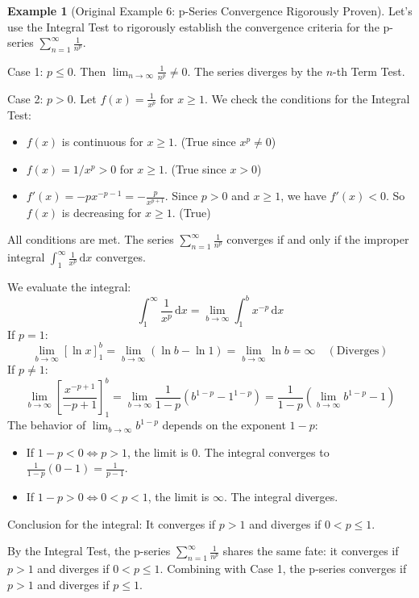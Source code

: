 \documentclass[11pt, letterpaper]{article}
\theoremstyle{plain} %
\theoremstyle{definition} %
\newtheorem{example}[theorem]{Example} %
\theoremstyle{remark} %
\newcommand{\dx}{\,\mathrm{d}x} %
\begin{document}
\begin{example}[Original Example 6: p-Series Convergence Rigorously Proven]
Let's use the Integral Test to rigorously establish the convergence criteria for the p-series $\sum_{n=1}^{\infty} \frac{1}{n^p}$.

Case 1: $p \le 0$. Then $\lim_{n \to \infty} \frac{1}{n^p} \neq 0$. The series diverges by the $n$-th Term Test.

Case 2: $p > 0$. Let $f(x) = \frac{1}{x^p}$ for $x \ge 1$. We check the conditions for the Integral Test:
\begin{itemize}
    \item $f(x)$ is continuous for $x \ge 1$. (True since $x^p \neq 0$)
    \item $f(x) = 1/x^p > 0$ for $x \ge 1$. (True since $x>0$)
    \item $f'(x) = -p x^{-p-1} = -\frac{p}{x^{p+1}}$. Since $p>0$ and $x \ge 1$, we have $f'(x) < 0$. So $f(x)$ is decreasing for $x \ge 1$. (True)
\end{itemize}
All conditions are met. The series $\sum_{n=1}^\infty \frac{1}{n^p}$ converges if and only if the improper integral $\int_1^{\infty} \frac{1}{x^p} \dx$ converges.

We evaluate the integral:
\[ \int_1^{\infty} \frac{1}{x^p} \dx = \lim_{b \to \infty} \int_1^b x^{-p} \dx \]
If $p=1$:
\[ \lim_{b \to \infty} [\ln x]_1^b = \lim_{b \to \infty} (\ln b - \ln 1) = \lim_{b \to \infty} \ln b = \infty \quad (\text{Diverges}) \]
If $p \neq 1$:
\[ \lim_{b \to \infty} \left[ \frac{x^{-p+1}}{-p+1} \right]_1^b = \lim_{b \to \infty} \frac{1}{1-p} (b^{1-p} - 1^{1-p}) = \frac{1}{1-p} \left( \lim_{b \to \infty} b^{1-p} - 1 \right) \]
The behavior of $\lim_{b \to \infty} b^{1-p}$ depends on the exponent $1-p$:
\begin{itemize}
    \item If $1-p < 0 \iff p > 1$, the limit is $0$. The integral converges to $\frac{1}{1-p}(0-1) = \frac{1}{p-1}$.
    \item If $1-p > 0 \iff 0 < p < 1$, the limit is $\infty$. The integral diverges.
\end{itemize}
Conclusion for the integral: It converges if $p > 1$ and diverges if $0 < p \le 1$.

By the Integral Test, the p-series $\sum_{n=1}^{\infty} \frac{1}{n^p}$ shares the same fate: it converges if $p > 1$ and diverges if $0 < p \le 1$. Combining with Case 1, the p-series converges if $p>1$ and diverges if $p \le 1$.
\end{example}
\end{document}
